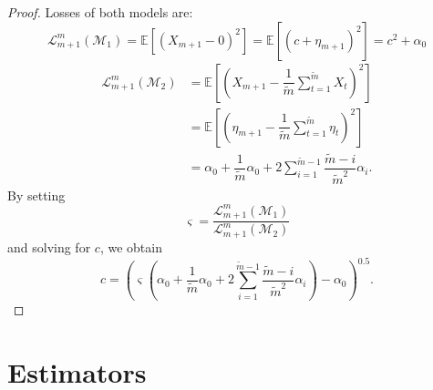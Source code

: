 \documentclass[11pt,dvipsnames]{article}
\newtheorem{proof}{Proof of Proposition}
\begin{document}
\begin{appendices}
\begin{proof}
Losses of both models are:
\begin{equation}
\mathcal{L}_{m+1}^{m}(\mathcal{M}_{1})
=\mathbb{E}\left[ \left( X_{m+1} - 0\right)^{2} \right]
=\mathbb{E}\left[ \left( c + \eta_{m+1}\right)^{2} \right]
=c^{2}+\alpha_{0}
\end{equation}
\begin{equation}
\begin{split}
\mathcal{L}_{m+1}^{m}(\mathcal{M}_{2})
&=\mathbb{E}\left[ \left( X_{m+1} - \dfrac{1}{\widetilde{m}}\sum_{t=1}^{\widetilde{m}} X_{t}\right)^{2} \right]\\
&=\mathbb{E}\left[ \left( \eta_{m+1} - \dfrac{1}{\widetilde{m}}\sum_{t=1}^{\widetilde{m}} \eta_{t}\right)^{2} \right]\\
&=\alpha_{0} + \dfrac{1}{\widetilde{m}}\alpha_{0}  + 2 \sum_{i=1}^{\widetilde{m}-1} \dfrac{\widetilde{m}-i}{\widetilde{m}^{2}}\alpha_{i}.
\end{split}
\end{equation}
By setting 
\begin{equation}
\varsigma=\dfrac{\mathcal{L}_{m+1}^{m}(\mathcal{M}_{1})}{\mathcal{L}_{m+1}^{m}(\mathcal{M}_{2})}
\end{equation}
and solving for $ c $, we obtain
\begin{equation}
c=\left(\varsigma\left( \alpha_{0} + \dfrac{1}{ \widetilde{m}}\alpha_{0} + 2 \sum_{i=1}^{\widetilde{m}-1}\dfrac{\widetilde{m}-i}{\widetilde{m}^2} \alpha_{i}\right) - \alpha_{0}\right)^{0.5}.
\end{equation}
\end{proof}

\newpage
\section{Estimators}\label{appendix:Estimators}



\end{appendices}
\end{document}
